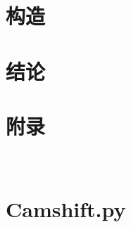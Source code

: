 \documentclass{article}
\begin{document}
\large




\newpage
\section{构造}

\section{结论}

\section{附录}
\newpage
\appendix
\section{\\Camshift.py} \label{App:AppendixA}
\end{document}
